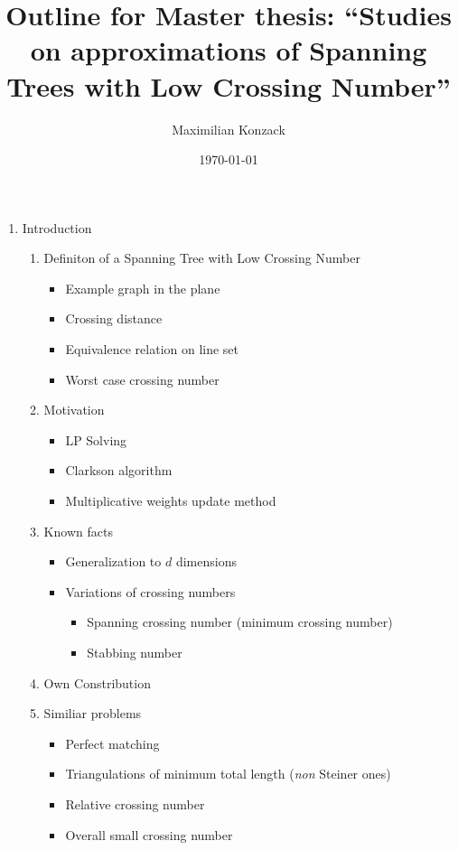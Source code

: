 \documentclass[a4paper,pagesize]{scrartcl}
\title{Outline for Master thesis: ``Studies on approximations of Spanning Trees
with Low Crossing Number''}
\author{Maximilian Konzack}
\date{\today}
\begin{document}
	\maketitle
    \begin{enumerate}
        \item Introduction
            \begin{enumerate}
                \item Definiton of a Spanning Tree with Low Crossing Number
                    \begin{itemize}
                        \item Example graph in the plane
                        \item Crossing distance
                        \item Equivalence relation on line set
                        \item Worst case crossing number
                    \end{itemize}
                \item Motivation
                    \begin{itemize}
                        \item LP Solving
                        \item Clarkson algorithm
                        \item Multiplicative weights update method
                    \end{itemize}
                \item Known facts
                    \begin{itemize}
                        \item Generalization to $d$ dimensions
                        \item Variations of crossing numbers
                        \begin{itemize}
                            \item Spanning crossing number (minimum crossing 
                                number)
                            \item Stabbing number
                        \end{itemize}
                    \end{itemize}
                \item Own Constribution
                \item Similiar problems
                    \begin{itemize}
                        \item Perfect matching
                        \item Triangulations of minimum total length
                            (\emph{non} Steiner ones)
                        \item Relative crossing number
                        \item Overall small crossing number
                    \end{itemize}
            \end{enumerate}


\end{enumerate}
\end{document}
